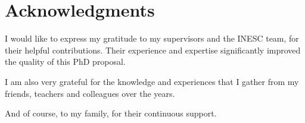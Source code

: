\chapter*{Acknowledgments}

I would like to express my gratitude to my supervisors and the INESC team, for their helpful contributions. Their experience and expertise significantly improved the quality of this PhD proposal.

I am also very grateful for the knowledge and experiences that I gather from my friends, teachers and colleagues over the years.

And of course, to my family, for their continuous support.

\vspace{10mm}
